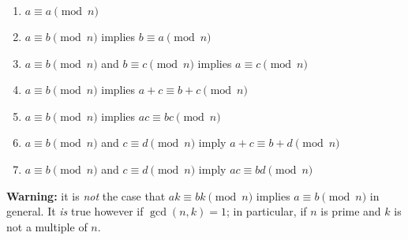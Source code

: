 \documentclass[12pt]{article}
\renewcommand{\divides}{\mathop{\mid}}
\begin{document}


%
%
%
%
%

\renewcommand{\labelenumi}{M\theenumi.}
\begin{enumerate}
\item $a \equiv a \pmod{n}$
\item $a \equiv b \pmod{n}$ implies $b \equiv a \pmod{n}$
\item $a \equiv b \pmod{n}$ and $b \equiv c \pmod{n}$ implies $a \equiv c \pmod{n}$
\item $a \equiv b \pmod{n}$ implies $a + c \equiv b + c \pmod{n}$
\item $a \equiv b \pmod{n}$ implies $a c \equiv b c \pmod{n}$
\item $a \equiv b \pmod{n}$ and $c \equiv d \pmod{n}$ imply $a + c
\equiv b + d \pmod{n}$
\item $a \equiv b \pmod{n}$ and $c \equiv d \pmod{n}$ imply $a c
\equiv b d \pmod{n}$
\end{enumerate}

\textbf{Warning:} it is \emph{not} the case that $ak \equiv bk \pmod{n}$ implies $a \equiv b \pmod{n}$ in general. It \emph{is} true however if $\gcd(n,k) = 1$; in particular, if $n$ is prime and $k$ is not a multiple of $n$.
\end{document}
